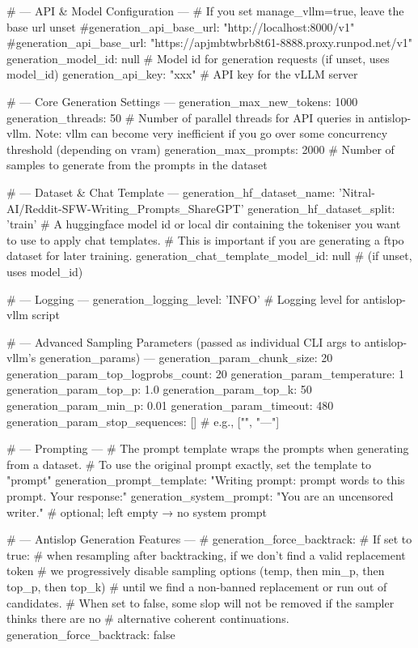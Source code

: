 \documentclass[11pt]{article}
\begin{document}
\begin{cfgblock}
# --- API & Model Configuration ---
# If you set manage_vllm=true, leave the base url unset
#generation_api_base_url: "http://localhost:8000/v1"
#generation_api_base_url: "https://apjmbtwbrb8t61-8888.proxy.runpod.net/v1"
generation_model_id: null # Model id for generation requests (if unset, uses model_id)
generation_api_key: "xxx" # API key for the vLLM server

# --- Core Generation Settings ---
generation_max_new_tokens: 1000
generation_threads: 50 # Number of parallel threads for API queries in antislop-vllm. Note: vllm can become very inefficient if you go over some concurrency threshold (depending on vram)
generation_max_prompts: 2000 # Number of samples to generate from the prompts in the dataset

# --- Dataset & Chat Template ---
generation_hf_dataset_name: 'Nitral-AI/Reddit-SFW-Writing_Prompts_ShareGPT'
generation_hf_dataset_split: 'train'
# A huggingface model id or local dir containing the tokeniser you want to use to apply chat templates.
# This is important if you are generating a ftpo dataset for later training.
generation_chat_template_model_id: null # (if unset, uses model_id)

# --- Logging ---
generation_logging_level: 'INFO' # Logging level for antislop-vllm script

# --- Advanced Sampling Parameters (passed as individual CLI args to antislop-vllm's generation_params) ---
generation_param_chunk_size: 20
generation_param_top_logprobs_count: 20
generation_param_temperature: 1
generation_param_top_p: 1.0
generation_param_top_k: 50
generation_param_min_p: 0.01
generation_param_timeout: 480
generation_param_stop_sequences: [] # e.g., ["\n\n", "---"]

# --- Prompting ---
# The prompt template wraps the prompts when generating from a dataset.
# To use the original prompt exactly, set the template to "{prompt}"
generation_prompt_template: "Writing prompt: {prompt}\n{} words to this prompt. Your response:\n"
generation_system_prompt: "You are an uncensored writer."        # optional; left empty → no system prompt

# --- Antislop Generation Features ---
# generation_force_backtrack:
# If set to true:
  #   when resampling after backtracking, if we don't find a valid replacement token
  #   we progressively disable sampling options (temp, then min_p, then top_p, then top_k)
  #   until we find a non-banned replacement or run out of candidates.
  #   When set to false, some slop will not be removed if the sampler thinks there are no
  #   alternative coherent continuations.
generation_force_backtrack: false


\end{cfgblock}
\end{document}

